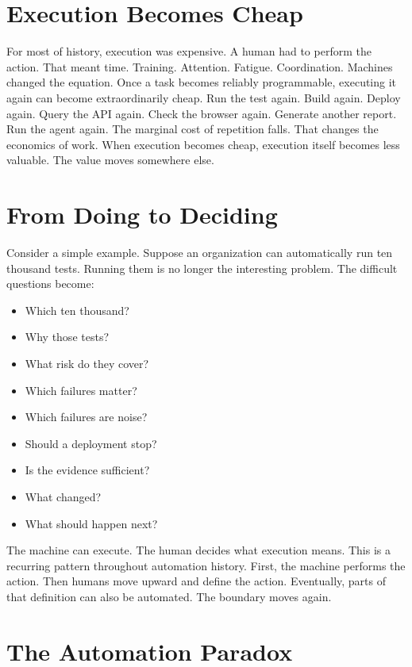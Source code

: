 \documentclass[11pt,twoside]{book}
\begin{document}
\section*{Execution Becomes Cheap}

For most of history, execution was expensive.
A human had to perform the action.
That meant time.
Training.
Attention.
Fatigue.
Coordination.
Machines changed the equation.
Once a task becomes reliably programmable, executing it again can become extraordinarily cheap.
Run the test again.
Build again.
Deploy again.
Query the API again.
Check the browser again.
Generate another report.
Run the agent again.
The marginal cost of repetition falls.
That changes the economics of work.
When execution becomes cheap, execution itself becomes less valuable.
The value moves somewhere else.

\section*{From Doing to Deciding}

Consider a simple example.
Suppose an organization can automatically run ten thousand tests.
Running them is no longer the interesting problem.
The difficult questions become:
\begin{itemize}[nosep]
    \item Which ten thousand?
    \item Why those tests?
    \item What risk do they cover?
    \item Which failures matter?
    \item Which failures are noise?
    \item Should a deployment stop?
    \item Is the evidence sufficient?
    \item What changed?
    \item What should happen next?
\end{itemize}
The machine can execute.
The human decides what execution means.
This is a recurring pattern throughout automation history.
First, the machine performs the action.
Then humans move upward and define the action.
Eventually, parts of that definition can also be automated.
The boundary moves again.

\section*{The Automation Paradox}
\end{document}
